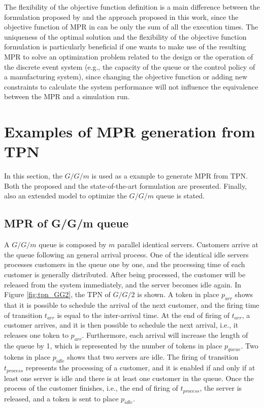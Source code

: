 \documentclass[suppldata]{interact}
\theoremstyle{plain}
\theoremstyle{definition}
\theoremstyle{remark}
\begin{document}
The flexibility of the objective function definition is a main difference between the formulation proposed by \cite{chan2008optimization} and the approach proposed in this work, since the objective function of MPR in \cite{chan2008optimization} can be only the sum of all the execution times. The uniqueness of the optimal solution and the flexibility of the objective function formulation is particularly beneficial if one wants to make use of the resulting MPR to solve an optimization problem %
related to the design or the operation of the discrete event system (e.g., %
the capacity of the queue or the control policy of a manufacturing system), since changing the objective function or adding new constraints to calculate the system performance will not influence the equivalence between the  MPR and a simulation run. %


\section{Examples of MPR generation from TPN}
\label{sec:example}
In this section, the $G/G/m$ is used as a example to generate MPR from TPN. Both the proposed and the state-of-the-art formulation are presented. Finally, also an extended model to optimize the $G/G/m$ queue is stated. 

\subsection{MPR of G/G/m queue}\label{sec:MPR_ggm}
A $G/G/m$ queue is composed by $m$ parallel identical servers. Customers arrive at the queue following an general arrival process. One of the identical idle servers processes customers in the queue one by one, and the processing time  of each customer is generally distributed. After being processed, the customer will be released from the system immediately, and the server becomes idle again. In Figure \ref{fig:tpn_GG2}, the TPN of $G/G/2$ is shown. A token in place $p_{arr}$ shows that it is possible to schedule the arrival of the next customer, and the firing time of transition $t_{arr}$ is equal to the inter-arrival time. At the end of firing of $t_{arr}$, a customer arrives, and it is  then possible to schedule the next arrival, i.e., it releases one token to $p_{arr}$. Furthermore, each arrival will increase the length of the queue by 1, which is represented by the number of tokens in place $p_{queue}$. Two tokens in place $p_{idle}$ shows that two servers are idle. The firing of transition $t_{process}$ represents the processing of a customer, and it is enabled if and only if at least one server is idle and there is at least one customer in the queue. Once the process of the customer finishes, i.e., the end of firing of $t_{process}$, the server is released, and a token is sent to place $p_{idle}$.
\end{document}
